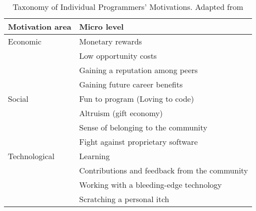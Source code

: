 \begin{table}
    \begin{tabularx}{\textwidth}{l X} %
    \toprule
    Motivation area & Micro level \\
    \midrule
    Economic & Monetary rewards \\
     & Low opportunity costs \\
     & Gaining a reputation among peers \\
     & Gaining future career benefits \\
    \midrule
    Social & Fun to program (Loving to code) \\
     & Altruism (gift economy) \\
     & Sense of belonging to the community \\
     & Fight against proprietary software \\
    \midrule
    Technological & Learning \\
     & Contributions and feedback from the community \\
     & Working with a bleeding-edge technology \\
     & Scratching a personal itch \\
    \bottomrule
    \end{tabularx} %
    \label{tab:taxonomy}
    \caption{Taxonomy of Individual Programmers’ Motivations. Adapted from \parencite{bonaccorsiComparingMotivationsIndividual2006}}

\end{table}